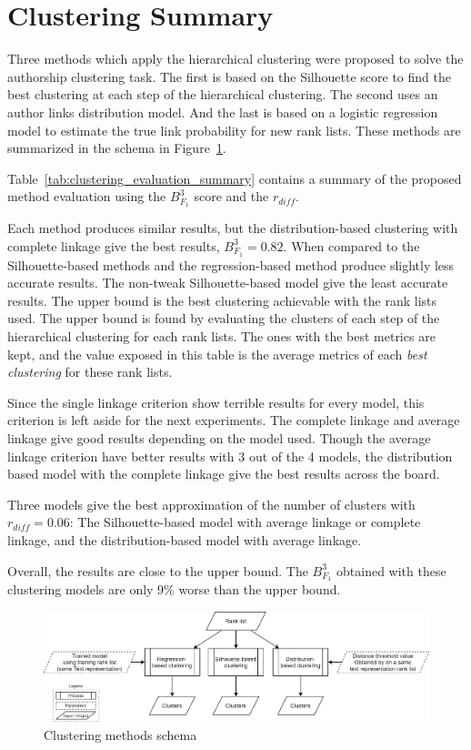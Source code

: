 \section{Clustering Summary}

Three methods which apply the hierarchical clustering were proposed to solve the authorship clustering task.
The first is based on the Silhouette score to find the best clustering at each step of the hierarchical clustering.
The second uses an author links distribution model.
And the last is based on a logistic regression model to estimate the true link probability for new rank lists.
These methods are summarized in the schema in Figure~\ref{fig:schema-clustering}.

Table~\ref{tab:clustering_evaluation_summary} contains a summary of the proposed method evaluation using the $B^3_{F_1}$ score and the $r_{diff}$.

Each method produces similar results, but the distribution-based clustering with complete linkage give the best results, $B^3_{F_1} = 0.82$.
When compared to the Silhouette-based methods and the regression-based method produce slightly less accurate results.
The non-tweak Silhouette-based model give the least accurate results.
The upper bound is the best clustering achievable with the rank lists used.
The upper bound is found by evaluating the clusters of each step of the hierarchical clustering for each rank lists.
The ones with the best metrics are kept, and the value exposed in this table is the average metrics of each \textit{best clustering} for these rank lists.

Since the single linkage criterion show terrible results for every model, this criterion is left aside for the next experiments.
The complete linkage and average linkage give good results depending on the model used.
Though the average linkage criterion have better results with 3 out of the 4 models, the distribution based model with the complete linkage give the best results across the board.

Three models give the best approximation of the number of clusters with $r_{diff} = 0.06$:
The Silhouette-based model with average linkage or complete linkage, and the distribution-based model with average linkage.

Overall, the results are close to the upper bound.
The $B^{3}_{F_1}$ obtained with these clustering models are only 9\% worse than the upper bound.

\begin{figure}
  \centering
  \caption{Clustering methods schema}
  \label{fig:schema-clustering}
  \includegraphics[width=1\linewidth]{img/schema-clustering.png}
\end{figure}

